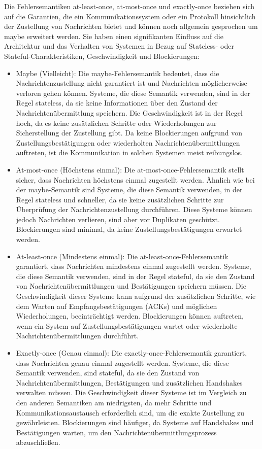 Die Fehlersemantiken at-least-once, at-most-once und exactly-once beziehen sich auf die Garantien, die ein Kommunikationssystem oder ein Protokoll hinsichtlich der Zustellung von Nachrichten bietet und können noch allgemein gesprochen um maybe erweitert werden. Sie haben einen signifikanten Einfluss auf die Architektur und das Verhalten von Systemen in Bezug auf Stateless- oder Stateful-Charakteristiken, Geschwindigkeit und Blockierungen:
\begin{itemize}
\item  Maybe (Vielleicht): Die maybe-Fehlersemantik bedeutet, dass die Nachrichtenzustellung nicht garantiert ist und Nachrichten möglicherweise verloren gehen können. Systeme, die diese Semantik verwenden, sind in der Regel stateless, da sie keine Informationen über den Zustand der Nachrichtenübermittlung speichern. Die Geschwindigkeit ist in der Regel hoch, da es keine zusätzlichen Schritte oder Wiederholungen zur Sicherstellung der Zustellung gibt. Da keine Blockierungen aufgrund von Zustellungsbestätigungen oder wiederholten Nachrichtenübermittlungen auftreten, ist die Kommunikation in solchen Systemen meist reibungslos.
\item At-most-once (Höchstens einmal): Die at-most-once-Fehlersemantik stellt sicher, dass Nachrichten höchstens einmal zugestellt werden. Ähnlich wie bei der maybe-Semantik sind Systeme, die diese Semantik verwenden, in der Regel stateless und schneller, da sie keine zusätzlichen Schritte zur Überprüfung der Nachrichtenzustellung durchführen. Diese Systeme können jedoch Nachrichten verlieren, sind aber vor Duplikaten geschützt. Blockierungen sind minimal, da keine Zustellungsbestätigungen erwartet werden.
\item At-least-once (Mindestens einmal): Die at-least-once-Fehlersemantik garantiert, dass Nachrichten mindestens einmal zugestellt werden. Systeme, die diese Semantik verwenden, sind in der Regel stateful, da sie den Zustand von Nachrichtenübermittlungen und Bestätigungen speichern müssen. Die Geschwindigkeit dieser Systeme kann aufgrund der zusätzlichen Schritte, wie dem Warten auf Empfangsbestätigungen (ACKs) und möglichen Wiederholungen, beeinträchtigt werden. Blockierungen können auftreten, wenn ein System auf Zustellungsbestätigungen wartet oder wiederholte Nachrichtenübermittlungen durchführt.
\item Exactly-once (Genau einmal): Die exactly-once-Fehlersemantik garantiert, dass Nachrichten genau einmal zugestellt werden. Systeme, die diese Semantik verwenden, sind stateful, da sie den Zustand von Nachrichtenübermittlungen, Bestätigungen und zusätzlichen Handshakes verwalten müssen. Die Geschwindigkeit dieser Systeme ist im Vergleich zu den anderen Semantiken am niedrigsten, da mehr Schritte und Kommunikationsaustausch erforderlich sind, um die exakte Zustellung zu gewährleisten. Blockierungen sind häufiger, da Systeme auf Handshakes und Bestätigungen warten, um den Nachrichtenübermittlungsprozess abzuschließen.
\end{itemize}
